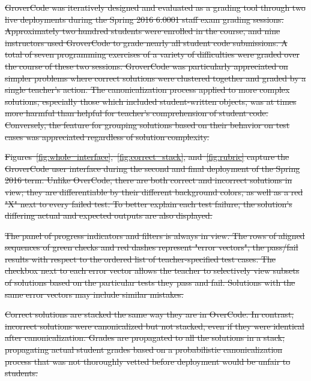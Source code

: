 \documentclass[12pt,twoside]{mitthesis}
\providecommand{\DIFdeltex}[1]{{\protect\color{red}\sout{#1}}}                      %
\providecommand{\DIFdel}[1]{\texorpdfstring{\DIFdeltex{#1}}{}} %
\begin{document}
\DIFdel{GroverCode was iteratively designed and evaluated as a grading tool through two live deployments during the Spring 2016 6.0001 staff exam grading sessions. Approximately two hundred students were enrolled in the course, and nine instructors used GroverCode to grade nearly all student code submissions. A total of seven programming exercises of a variety of difficulties were graded over the course of these two sessions. GroverCode was particularly appreciated on simpler problems where correct solutions were clustered together and graded by a single teacher's action. The canonicalization process applied to more complex solutions, especially those which included student-written objects, was at times more harmful than helpful for teacher's comprehension of student code. Conversely, the feature for grouping solutions based on their behavior on test cases was appreciated regardless of solution complexity.
}%


\DIFdel{Figures~\ref{fig:whole_interface},~\ref{fig:correct_stack}, and~\ref{fig:rubric} capture the GroverCode user interface during the second and final deployment of the Spring 2016 term. Unlike OverCode, there are both correct and incorrect solutions in view; they are differentiable by their different background colors, as well as a red "X" next to every failed test. To better explain each test failure, the solution's differing actual and expected outputs are also displayed. 
}%

\DIFdel{The panel of progress indicators and filters is always in view. The rows of aligned sequences of green checks and red dashes represent "error vectors", the pass/fail results with respect to the ordered list of teacher-specified test cases. The checkbox next to each error vector allows the teacher to selectively view subsets of solutions based on the particular tests they pass and fail. Solutions with the same error vectors may include similar mistakes.
}%

\DIFdel{Correct solutions are stacked the same way they are in OverCode. In contrast, incorrect solutions were canonicalized but not stacked, even if they were identical after canonicalization. Grades are propagated to all the solutions in a stack; propagating actual student grades based on a probabilistic canonicalization process that was not thoroughly vetted before deployment would be unfair to students. 
}%
\end{document}
